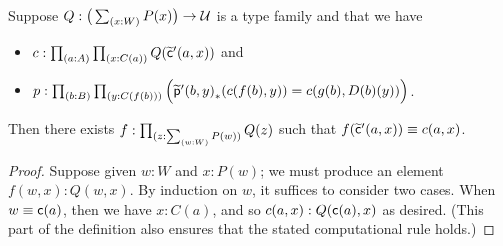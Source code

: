\begin{lem}\label{thm:flattening-rect}
  Suppose $Q:\big(\sm{x:W} P(x)\big) \to \type$ is a type family and that we have
  \begin{itemize}
  \item $c : \prd{a:A}{x:C(a)} Q(\cct'(a,x))$ and
  \item $p : \prd{b:B}{y:C(f(b))} \Big(\trans{\ppt'(b,y)}{c(f(b),y)} = %
    c(g(b),D(b)(y))\Big)$.
  \end{itemize}
  Then there exists $f:\prd{z:\sm{w:W} P(w)} Q(z)$ such that $f(\widetilde{\mathsf{c}}'(a,x)) \equiv c(a,x)$.
\end{lem}
\begin{proof}
  Suppose given $w:W$ and $x:P(w)$; we must produce an element $f(w,x):Q(w,x)$.
  By induction on $w$, it suffices to consider two cases.
  When $w\equiv \mathsf{c}(a)$, then we have $x:C(a)$, and so $c(a,x):Q(\mathsf{c}(a),x)$ as desired.
  (This part of the definition also ensures that the stated computational rule holds.)


\end{proof}
